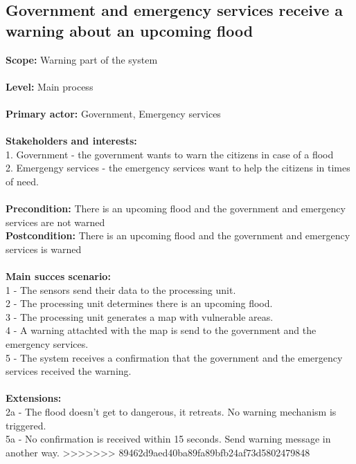 \subsection{Government and emergency services receive a warning about an upcoming flood}
\textbf{Scope:} Warning part of the system\\\\
\textbf{Level:} Main process\\\\
\textbf{Primary actor:} Government, Emergency services\\\\
\textbf{Stakeholders and interests:}\\
	1. Government - the government wants to warn the citizens in case of a flood \\
	2. Emergengy services - the emergency services want to help the citizens in times of need.\\\\
\textbf{Precondition:} There is an upcoming flood and the government and emergency services are not warned\\
\textbf{Postcondition:} There is an upcoming flood and the government and emergency services is warned\\\\
\textbf{Main succes scenario:} \\
1 - The sensors send their data to the processing unit.\\
2 - The processing unit determines there is an upcoming flood.\\
3 - The processing unit generates a map with vulnerable areas.\\
4 - A warning attachted with the map is send to the government and the emergency services.\\
5 - The system receives a confirmation that the government and the emergency services received the warning.\\\\
\textbf{Extensions:} \\
2a - The flood doesn't get to dangerous, it retreats. No warning mechanism is triggered.\\
5a - No confirmation is received within 15 seconds. Send warning message in another way. 
>>>>>>> 89462d9aed40ba89fa89bfb24af73d5802479848

